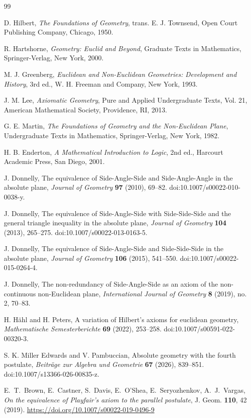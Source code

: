 \documentclass[11pt,a4paper]{article}
\theoremstyle{definition}
\theoremstyle{remark}
\numberwithin{equation}{section}
\begin{document}
\begin{thebibliography}{99}

D. Hilbert,
\textit{The Foundations of Geometry},
trans. E. J. Townsend,
Open Court Publishing Company, Chicago, 1950.

R. Hartshorne,
\textit{Geometry: Euclid and Beyond},
Graduate Texts in Mathematics,
Springer-Verlag, New York, 2000.

M. J. Greenberg,
\textit{Euclidean and Non-Euclidean Geometries: Development and History},
3rd ed.,
W. H. Freeman and Company, New York, 1993.

J. M. Lee,
\textit{Axiomatic Geometry},
Pure and Applied Undergraduate Texts, Vol. 21,
American Mathematical Society, Providence, RI, 2013.

G. E. Martin,
\textit{The Foundations of Geometry and the Non-Euclidean Plane},
Undergraduate Texts in Mathematics,
Springer-Verlag, New York, 1982.

H. B. Enderton,
\textit{A Mathematical Introduction to Logic},
2nd ed.,
Harcourt Academic Press, San Diego, 2001.

J. Donnelly,
The equivalence of Side-Angle-Side and Side-Angle-Angle in the absolute plane,
\textit{Journal of Geometry} \textbf{97} (2010), 69--82.
doi:10.1007/s00022-010-0038-y.

J. Donnelly,
The equivalence of Side-Angle-Side with Side-Side-Side and the general triangle inequality in the absolute plane,
\textit{Journal of Geometry} \textbf{104} (2013), 265--275.
doi:10.1007/s00022-013-0163-5.

J. Donnelly,
The equivalence of Side-Angle-Side and Side-Side-Side in the absolute plane,
\textit{Journal of Geometry} \textbf{106} (2015), 541--550.
doi:10.1007/s00022-015-0264-4.

J. Donnelly,
The non-redundancy of Side-Angle-Side as an axiom of the non-continuous non-Euclidean plane,
\textit{International Journal of Geometry} \textbf{8} (2019), no. 2, 70--83.

H. H\"{a}hl and H. Peters,
A variation of Hilbert's axioms for euclidean geometry,
\textit{Mathematische Semesterberichte} \textbf{69} (2022), 253--258.
doi:10.1007/s00591-022-00320-3.

S. K. Miller Edwards and V. Pambuccian,
Absolute geometry with the fourth postulate,
\textit{Beitr\"age zur Algebra und Geometrie} \textbf{67} (2026), 839--851.
doi:10.1007/s13366-026-00835-z.

E.~T.~Brown, E.~Castner, S.~Davis, E.~O'Shea, E.~Seryozhenkov, A.~J.~Vargas,
\emph{On the equivalence of Playfair's axiom to the parallel postulate},
J. Geom. \textbf{110}, 42 (2019).
\url{https://doi.org/10.1007/s00022-019-0496-9}


\end{thebibliography}
\end{document}
